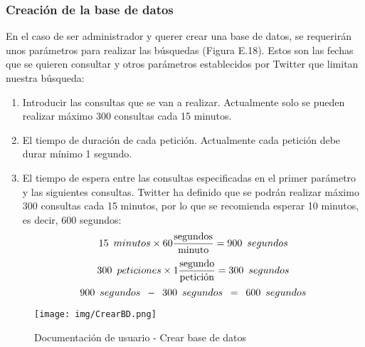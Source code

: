 \subsubsection{Creación de la base de datos}
En el caso de ser administrador y querer crear una base de datos, se requerirán unos parámetros para realizar las búsquedas (Figura E.18). Estos son las fechas que se quieren consultar y otros parámetros establecidos por Twitter que limitan nuestra búsqueda:
\begin{enumerate}
     \item Introducir las consultas que se van a realizar. Actualmente solo se pueden realizar máximo 300 consultas cada 15 minutos.
    \item El tiempo de duración de cada petición. Actualmente cada petición debe durar mínimo 1 segundo.
    \item El tiempo de espera entre las consultas especificadas en el primer parámetro y las siguientes consultas. Twitter ha definido que se podrán realizar máximo 300 consultas cada 15 minutos, por lo que se recomienda esperar 10 minutos, es decir, 600 segundos:\\
    $$ 15\hspace{0.5em}minutos\times60\frac{\text{segundos}}{\text{minuto}}=900\hspace{0.5em}segundos $$
    $$ 300\hspace{0.5em}peticiones\times1\frac{\text{segundo}}{\text{petición}}=300\hspace{0.5em}segundos $$
    $$ 900\hspace{0.5em}segundos\hspace{0.5em}-\hspace{0.5em} 300\hspace{0.5em}segundos\hspace{0.5em}=\hspace{0.5em}600\hspace{0.5em}segundos$$
\end{enumerate}
\begin{figure}[h!]
    \centering
    \texttt{[image: img/CrearBD.png]} \\
    \caption{Documentación de usuario - Crear base de datos}
    \label{Documentación de usuario - Crear base de datos}
\end{figure}
